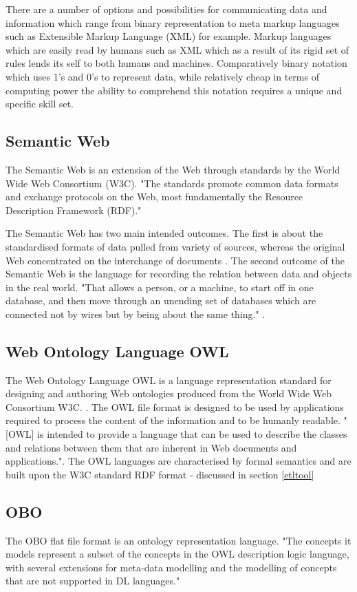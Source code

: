 There are a number of options and possibilities for communicating data and information which range from binary representation to meta markup languages such as Extensible Markup Language (XML) for example. Markup languages which are easily read by humans such as XML which as a result of its rigid set of rules lends its self to both humans and machines. Comparatively binary notation which uses 1's and 0's to represent data, while relatively cheap in terms of computing power the ability to comprehend this notation requires a unique and specific skill set.

\subsection{Semantic Web}\label{semanticweb}
The Semantic Web is an extension of the Web through standards by the World Wide Web Consortium (W3C). "The standards promote common data formats and exchange protocols on the Web, most fundamentally the Resource Description Framework (RDF)." \cite{semantic}

The Semantic Web has two main intended outcomes. The first is about the standardised formats of data pulled from variety of sources, whereas the original Web concentrated on the interchange of documents \cite{semantic}. The second outcome of the Semantic Web is the language for recording the relation between data and objects in the real world. "That allows a person, or a machine, to start off in one database, and then move through an unending set of databases which are connected not by wires but by being about the same thing."  \cite{semantic}. 

\subsection{Web Ontology Language OWL}\label{owl}
The Web Ontology Language OWL is a language representation standard for designing and authoring Web ontologies produced from the World Wide Web Consortium W3C. \cite{owl}. The OWL file format is designed to be used by applications required to process the content of the information and to be humanly readable. "[OWL] is intended to provide a language that can be used to describe the classes and relations between them that are inherent in Web documents and applications."\cite{owl}. The OWL languages are characterised by formal semantics and are built upon the W3C standard RDF format - discussed in section \ref{etltool}

\subsection{OBO}\label{obo}
The OBO flat file format is an ontology representation language. "The concepts it models represent a subset of the concepts in the OWL description logic language, with several extensions for meta-data modelling and the modelling of concepts that are not supported in DL languages." \cite{obo}

